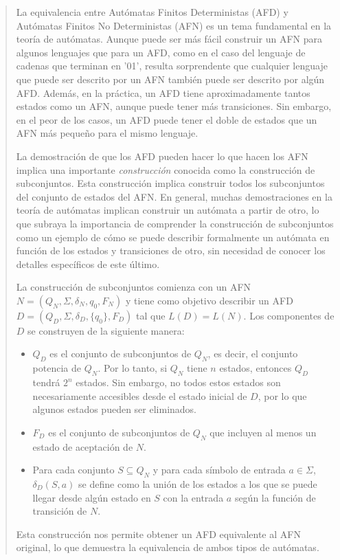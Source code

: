 \documentclass{article}
\begin{document}
    \begin{quote}
        La equivalencia entre Autómatas Finitos Deterministas (AFD) y Autómatas Finitos No Deterministas (AFN) es un tema fundamental
        en la teoría de autómatas. Aunque puede ser más fácil construir un AFN para algunos lenguajes que para un AFD, como en el caso del
        lenguaje de cadenas que terminan en '01', resulta sorprendente que cualquier lenguaje que puede ser descrito por un AFN también
        puede ser descrito por algún AFD.{\@} Además, en la práctica, un AFD tiene aproximadamente tantos estados como un AFN, aunque puede
        tener más transiciones. Sin embargo, en el peor de los casos, un AFD puede tener el doble de estados que un AFN más pequeño para
        el mismo lenguaje.

        La demostración de que los AFD pueden hacer lo que hacen los AFN implica una importante \textit{construcción} conocida como la
        construcción de subconjuntos. Esta construcción implica construir todos los subconjuntos del conjunto de estados del AFN.{\@}
        En general, muchas demostraciones en la teoría de autómatas implican construir un autómata a partir de otro, lo que subraya
        la importancia de comprender la construcción de subconjuntos como un ejemplo de cómo se puede describir formalmente un autómata
        en función de los estados y transiciones de otro, sin necesidad de conocer los detalles específicos de este último.

        La construcción de subconjuntos comienza con un AFN \(N = (Q_N, \Sigma, \delta_N, q_0, F_N)\) y tiene como objetivo describir un
        AFD \(D = (Q_D, \Sigma, \delta_D, \{q_0\}, F_D)\) tal que \(L(D) = L(N)\). Los componentes de \(D\) se construyen de la siguiente
        manera:

        \begin{itemize}
            \item \(Q_D\) es el conjunto de subconjuntos de \(Q_N\), es decir, el conjunto potencia de \(Q_N\). Por lo tanto, si \(Q_N\)
            tiene \(n\) estados, entonces \(Q_D\) tendrá \(2^n\) estados. Sin embargo, no todos estos estados son necesariamente accesibles
            desde el estado inicial de \(D\), por lo que algunos estados pueden ser eliminados.
            \item \(F_D\) es el conjunto de subconjuntos de \(Q_N\) que incluyen al menos un estado de aceptación de \(N\).
            \item Para cada conjunto \(S \subseteq Q_N\) y para cada símbolo de entrada \(a \in \Sigma\), \(\delta_D(S, a)\) se define
            como la unión de los estados a los que se puede llegar desde algún estado en \(S\) con la entrada \(a\) según la función de
            transición de \(N\).
        \end{itemize}

        Esta construcción nos permite obtener un AFD equivalente al AFN original, lo que demuestra la equivalencia de ambos tipos de
        autómatas.\cite{hopcroft2007introduccion}
    \end{quote}
\end{document}
